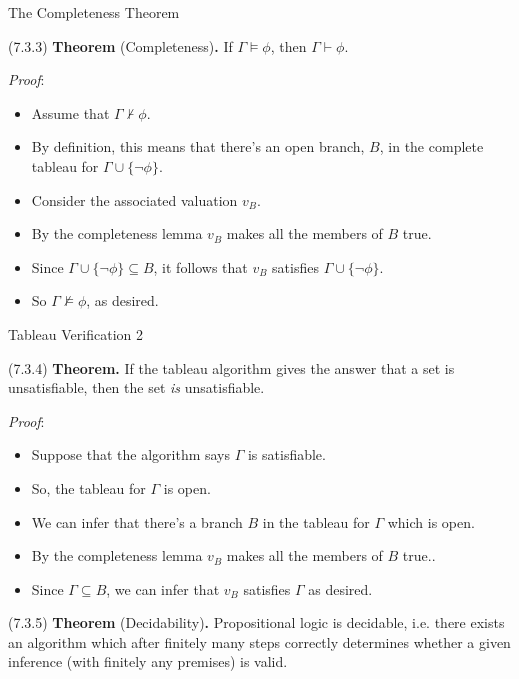\begin{frame}{The Completeness Theorem}

(7.3.3) \textbf{Theorem} (Completeness)\textbf{.} If $\Gamma\vDash\phi$, then $\Gamma\vdash\phi$.

\emph{Proof}:

	\begin{itemize}
		
		\item Assume that $\Gamma\nvdash\phi$.
		
		\item By definition, this means that there's an open branch, $B$, in the complete tableau for $\Gamma\cup\{\neg\phi\}$.
		
		\item Consider the associated valuation $v_B$.
		
		\item By the completeness lemma $v_B$ makes all the members of $B$ true.
		
		\item Since $\Gamma\cup\{\neg\phi\}\subseteq B$, it follows that $v_B$ satisfies $\Gamma\cup\{\neg\phi\}$.
		
		\item So $\Gamma\nvDash\phi$, as desired.
	
	\end{itemize}

\end{frame}

\begin{frame}{Tableau Verification 2}

	(7.3.4) \textbf{Theorem.} If the tableau algorithm gives the answer that a set is unsatisfiable, then the set \emph{is} unsatisfiable. 

	\emph{Proof}:
	
	\begin{itemize}
	
		\item Suppose that the algorithm says $\Gamma$ is satisfiable.
		
		\item So, the tableau for $\Gamma$ is open.
				
		\item We can infer that there's a branch $B$ in the tableau for $\Gamma$ which is open. 
	
		\item By the completeness lemma $v_B$ makes all the members of $B$ true..
		
		\item Since $\Gamma\subseteq B$, we can infer that $v_B$ satisfies $\Gamma$ as desired.
	
	\end{itemize}
	
	(7.3.5) \textbf{Theorem} (Decidability)\textbf{.} 	Propositional logic is decidable, i.e. there exists an algorithm which after finitely many steps correctly determines whether a given inference (with finitely any premises) is valid.


\end{frame}

